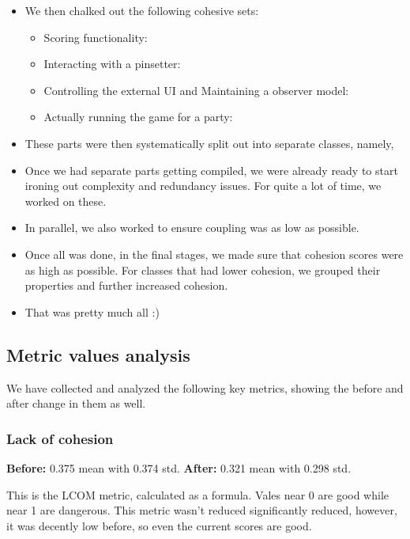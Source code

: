 \begin{itemize}
    \item We then chalked out the following cohesive sets:
          \begin{itemize}
              \item Scoring functionality: 
              \item Interacting with a pinsetter: 
              \item Controlling the external UI and Maintaining a observer model: 
              \item Actually running the game for a party: 
          \end{itemize}

    \item These parts were then systematically split out into separate classes, namely, 
    \item Once we had separate parts getting compiled, we were already ready to start ironing out complexity and redundancy issues. For quite a lot of time, we worked on these.
    \item In parallel, we also worked to ensure coupling was as low as possible.
    \item Once all was done, in the final stages, we made sure that cohesion scores were as high as possible. For classes that had lower cohesion, we grouped their properties and further increased cohesion.
    \item That was pretty much all :)
\end{itemize}

\subsection{Metric values analysis}

We have collected and analyzed the following key metrics, showing the before and after change in them as well.

\subsubsection{Lack of cohesion}

\textbf{Before:} 0.375 mean with 0.374 std.
\textbf{After:} 0.321 mean with 0.298 std.

This is the LCOM metric, calculated as a formula. Vales near 0 are good while near 1 are dangerous. This metric wasn't reduced significantly reduced, however, it was decently low before, so even the current scores are good.

